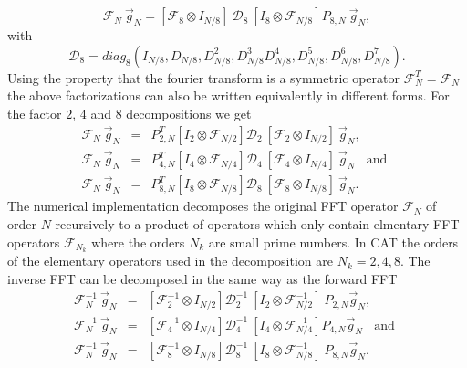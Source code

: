 \begin{equation}  \label{eq_FNFNr8}
 \mathcal{F}_{N} \ \vec{g}_{N} 
   = 
 \left[
  \mathcal{F}_{8} \otimes I_{N/8}
 \right] \ 
  \mathcal{D}_{8} \ 
 \left[
  I_{8} \otimes \mathcal{F}_{N/8}
 \right] 
 P_{8,N} \ \vec{g}_{N},
\end{equation}
with
\begin{equation}  \label{eq_FNFNr8def01}
 \mathcal{D}_{8} =  
 diag_{8} \left(I_{N/8},D_{N/8},D^{2}_{N/8},D^{3}_{N/8}
                D^{4}_{N/8},D^{5}_{N/8},D^{6}_{N/8},D^{7}_{N/8} \right).
\end{equation}
Using the property that the fourier transform is a symmetric operator 
$\mathcal{F}^{T}_{N} = \mathcal{F}_{N}$ the above factorizations can also 
be written equivalently in different forms. For the factor $2$, $4$ and 
$8$ decompositions we get
\begin{eqnarray}  \label{eq_FNFNr2_T}
 \mathcal{F}_{N} \ \vec{g}_{N}
  &=&
 P^{T}_{2,N} \left[I_{2} \otimes \mathcal{F}_{N/2} \right] 
 \mathcal{D}_{2} \ 
 \left[\mathcal{F}_{2} \otimes I_{N/2} \right] \ 
 \vec{g}_{N},
  \\ \label{eq_FNFNr4_T}
 \mathcal{F}_{N} \ \vec{g}_{N}
  &=&
 P^{T}_{4,N} \left[I_{4} \otimes \mathcal{F}_{N/4} \right] 
 \mathcal{D}_{4} \ 
 \left[\mathcal{F}_{4} \otimes I_{N/4} \right] \ 
 \vec{g}_{N}
 \ \ \ \ \mbox{and} \ \
  \\ \label{eq_FNFNr8_T}
 \mathcal{F}_{N} \ \vec{g}_{N}
  &=&
 P^{T}_{8,N} \left[I_{8} \otimes \mathcal{F}_{N/8} \right]
 \mathcal{D}_{8} \ 
 \left[\mathcal{F}_{8} \otimes I_{N/8} \right] \ 
 \vec{g}_{N}.
\end{eqnarray}
The numerical implementation decomposes the original FFT operator 
$\mathcal{F}_{N}$ of order $N$ recursively to a product of operators
which only contain elmentary FFT operators $\mathcal{F}_{N_{k}}$ 
where the orders $N_{k}$ are small prime numbers. In CAT the orders 
of the elementary operators used in the decomposition are 
$N_{k} = 2,4,8$. The inverse FFT can be decomposed in the same way
as the forward FFT 
\begin{eqnarray}  \label{eq_FNFNr2_inverse}
 \mathcal{F}^{-1}_{N} \ \vec{g}_{N}
  &=&
 \left[\mathcal{F}^{-1}_{2} \otimes I_{N/2} \right]
 \mathcal{D}^{-1}_{2} \ 
 \left[I_{2} \otimes \mathcal{F}^{-1}_{N/2} \right] \
 P_{2,N}
 \vec{g}_{N},
  \\ \label{eq_FNFNr4_inverse}
 \mathcal{F}^{-1}_{N} \ \vec{g}_{N}
  &=&
 \left[\mathcal{F}^{-1}_{4} \otimes I_{N/4} \right]
 \mathcal{D}^{-1}_{4} \
 \left[I_{4} \otimes \mathcal{F}^{-1}_{N/4} \right] 
 P_{4,N}
 \vec{g}_{N}
 \ \ \ \ \mbox{and} \ \
  \\ \label{eq_FNFNr8_inverse}
 \mathcal{F}^{-1}_{N} \ \vec{g}_{N}
  &=&
 \left[\mathcal{F}^{-1}_{8} \otimes I_{N/8} \right]
 \mathcal{D}^{-1}_{8} \
 \left[I_{8} \otimes \mathcal{F}^{-1}_{N/8} \right] \
  P_{8,N}
 \vec{g}_{N}.
\end{eqnarray}
